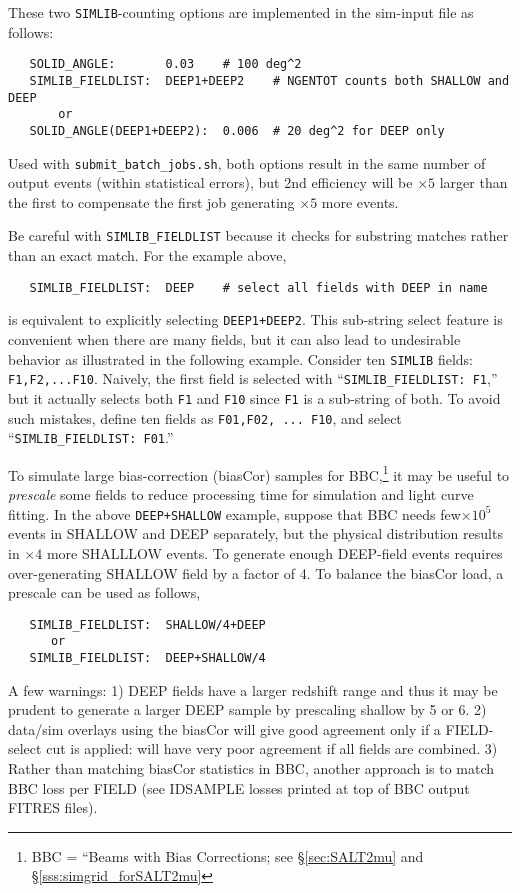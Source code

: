 \documentclass[12pt]{article}
\newcommand{\submit}{\tt submit\_batch\_jobs.sh}
\begin{document}
{These two {\tt SIMLIB}-counting options are implemented in 
the sim-input file as follows:
\begin{verbatim}
   SOLID_ANGLE:       0.03    # 100 deg^2
   SIMLIB_FIELDLIST:  DEEP1+DEEP2    # NGENTOT counts both SHALLOW and DEEP
       or
   SOLID_ANGLE(DEEP1+DEEP2):  0.006  # 20 deg^2 for DEEP only   
\end{verbatim}
%
Used with {\submit}, both options result in the same number of output 
events (within statistical errors), but 2nd efficiency will
be $\times 5$ larger than the first to compensate the first job
generating $\times 5$ more events.

Be careful with {\tt SIMLIB\_FIELDLIST} because it checks for 
substring matches rather than an exact match. 
For the example above,
\begin{verbatim}
   SIMLIB_FIELDLIST:  DEEP    # select all fields with DEEP in name
\end{verbatim}
%
is equivalent to explicitly selecting {\tt DEEP1+DEEP2}.
This sub-string select feature is convenient when there are many
fields, but it can also lead to undesirable behavior as illustrated
in the following example. 
Consider ten {\tt SIMLIB} fields: {\tt F1,F2,...F10}. 
Naively, the first field is selected with 
``{\tt SIMLIB\_FIELDLIST: F1},''  but it actually selects both
{\tt F1} and {\tt F10} since {\tt F1} is a sub-string of both.
To avoid such mistakes, define ten fields as {\tt F01,F02, ... F10}, 
and select ``{\tt SIMLIB\_FIELDLIST: F01}.''

To simulate large bias-correction (biasCor) samples for 
BBC,\footnote{BBC = ``Beams with Bias Corrections; 
     see \S\ref{sec:SALT2mu} and \S\ref{sss:simgrid_forSALT2mu}}
it may be useful to {\it prescale} some fields to reduce processing 
time for simulation and light curve fitting.
In the above {\tt DEEP+SHALLOW} example, suppose that BBC needs
few$\times 10^5$ events in SHALLOW and DEEP separately, 
but the physical distribution results in $\times 4$ more 
SHALLLOW events. To generate enough DEEP-field events requires
over-generating SHALLOW field by a factor of 4. To balance
the biasCor load, a prescale can be used as follows,
\begin{verbatim}
   SIMLIB_FIELDLIST:  SHALLOW/4+DEEP 
      or
   SIMLIB_FIELDLIST:  DEEP+SHALLOW/4
\end{verbatim}
A few warnings:
1) DEEP fields have a larger redshift range and thus it may be 
prudent to generate a larger DEEP sample by prescaling shallow by 5 or 6.
2) data/sim overlays using the biasCor will give good agreement only
   if a FIELD-select cut is applied:
   will have very poor agreement if all fields are combined.
3) Rather than matching biasCor statistics in BBC, another approach
   is to match BBC loss per FIELD 
    (see IDSAMPLE losses printed at top of BBC output FITRES files).

}
\end{document}
